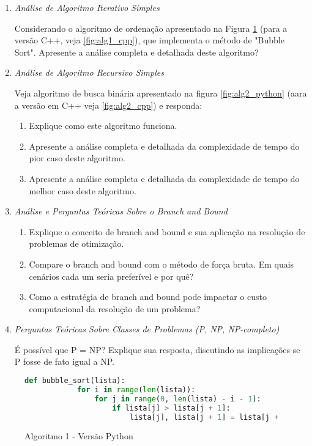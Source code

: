 \documentclass{article}
\begin{document}
\begin{enumerate}
    

\item \textit{Análise de Algoritmo Iterativo Simples}

Considerando o algoritmo de ordenação apresentado na Figura \ref{fig:alg1_pyhton} (para a versão C++, veja \ref{fig:alg1_cpp}), que implementa o método de "Bubble Sort". Apresente a análise completa e detalhada deste algoritmo? 

\item \textit{Análise de Algoritmo Recursivo Simples}

Veja algoritmo de busca binária apresentado na figura \ref{fig:alg2_python}  (aara a versão em C++ veja \ref{fig:alg2_cpp}) e responda:

\begin{enumerate}
\item Explique como este algoritmo funciona. 
\item Apresente a análise completa e detalhada da complexidade de tempo do pior caso deste algoritmo. 
\item Apresente a análise completa e detalhada da complexidade de tempo do melhor caso deste algoritmo. 
\end{enumerate}

\item \textit{Análise e Perguntas Teóricas Sobre o Branch and Bound}

\begin{enumerate}
\item  Explique o conceito de branch and bound e sua aplicação na resolução de problemas de otimização. 
\item  Compare o branch and bound com o método de força bruta. Em quais cenários cada um seria preferível e por quê? 
\item  Como a estratégia de branch and bound pode impactar o custo computacional da resolução de um problema? 
\end{enumerate}

\item \textit{Perguntas Teóricas Sobre Classes de Problemas (P, NP, NP-completo)}

É possível que P = NP? Explique sua resposta, discutindo as implicações se P fosse de fato igual a NP. 

\end{enumerate}


\begin{figure} [!ht]
    \begin{lstlisting}[language=Python]
        def bubble_sort(lista):
            for i in range(len(lista)):
                for j in range(0, len(lista) - i - 1):
                    if lista[j] > lista[j + 1]:
                        lista[j], lista[j + 1] = lista[j + 1], lista[j]
        \end{lstlisting}
        \label{fig:alg1_pyhton}
        \caption{Algoritmo 1 - Versão Python}
\end{figure}
\end{document}

